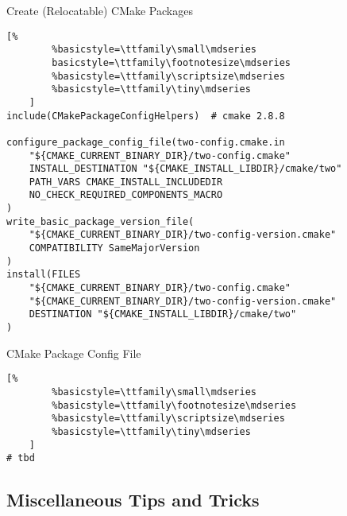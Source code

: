 \documentclass[t]{beamer}
\begin{document}
\begin{frame}[fragile]{Create (Relocatable) CMake Packages}
    \begin{lstlisting}[%
        %basicstyle=\ttfamily\small\mdseries
        basicstyle=\ttfamily\footnotesize\mdseries
        %basicstyle=\ttfamily\scriptsize\mdseries
        %basicstyle=\ttfamily\tiny\mdseries
    ]
include(CMakePackageConfigHelpers)	# cmake 2.8.8

configure_package_config_file(two-config.cmake.in
	"${CMAKE_CURRENT_BINARY_DIR}/two-config.cmake"
	INSTALL_DESTINATION "${CMAKE_INSTALL_LIBDIR}/cmake/two"
	PATH_VARS CMAKE_INSTALL_INCLUDEDIR
	NO_CHECK_REQUIRED_COMPONENTS_MACRO
)
write_basic_package_version_file(
	"${CMAKE_CURRENT_BINARY_DIR}/two-config-version.cmake"
	COMPATIBILITY SameMajorVersion
)
install(FILES
	"${CMAKE_CURRENT_BINARY_DIR}/two-config.cmake"
	"${CMAKE_CURRENT_BINARY_DIR}/two-config-version.cmake"
	DESTINATION "${CMAKE_INSTALL_LIBDIR}/cmake/two"
)
    \end{lstlisting}

\end{frame}

\begin{frame}[fragile]{CMake Package Config File}
    \begin{lstlisting}[%
        %basicstyle=\ttfamily\small\mdseries
        %basicstyle=\ttfamily\footnotesize\mdseries
        %basicstyle=\ttfamily\scriptsize\mdseries
        %basicstyle=\ttfamily\tiny\mdseries
    ]
# tbd
    \end{lstlisting}
\end{frame}

\subsection{Miscellaneous Tips and Tricks}
\end{document}
